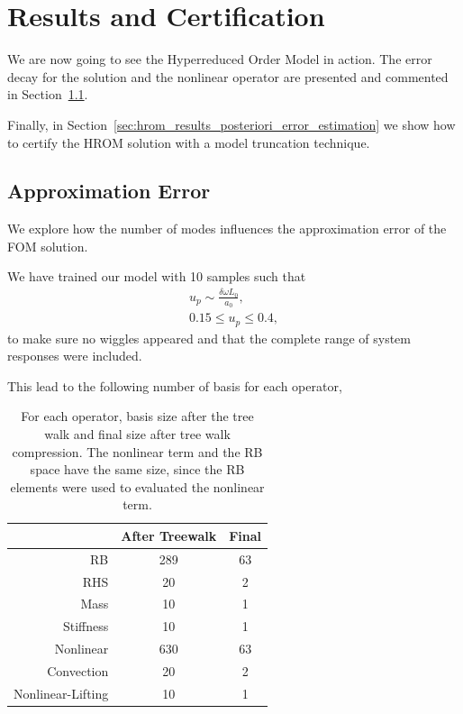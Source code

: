 \documentclass[../../thesis.tex]{subfiles}
\begin{document}
\section{Results and Certification}
\label{sec:results_and_certification}
We are now going to see the Hyperreduced Order Model in action.
The error decay for the solution and the nonlinear operator 
are presented and commented in Section~\ref{sec:hrom_results_reduced_basis}.

Finally, in Section~\ref{sec:hrom_results_posteriori_error_estimation} we show 
how to certify the HROM solution with a model truncation technique.  

\subsection{Approximation Error}
\label{sec:hrom_results_reduced_basis}
We explore how the number of modes influences the approximation error of the FOM solution.

We have trained our model with 10 samples such that
\begin{align*}
    u_p \sim \frac{\delta \omega L_0}{a_0},
    \nonumber
    \\
    0.15 \leq u_p \leq 0.4,
\end{align*}
to make sure no wiggles appeared and 
that the complete range of system responses were included.

This lead to the following number of basis for each operator,
\begin{table}[!h]
    \caption{For each operator,
    basis size after the tree walk and final size after tree walk compression.
    The nonlinear term and the RB space have the same size, 
    since the RB elements were used to evaluated the nonlinear term.}
    \centering
    \begin{tabular}{@{}rcc@{}}
    \toprule
                      & After Treewalk & Final \\ \midrule
    RB                & 289            & 63                \\
    RHS               & 20             & 2                 \\
    Mass              & 10             & 1                 \\
    Stiffness         & 10             & 1                 \\
    Nonlinear         & 630            & 63                \\
    Convection        & 20             & 2                 \\
    Nonlinear-Lifting & 10             & 1                 \\ \bottomrule
    \end{tabular}
    \end{table}
\end{document}
